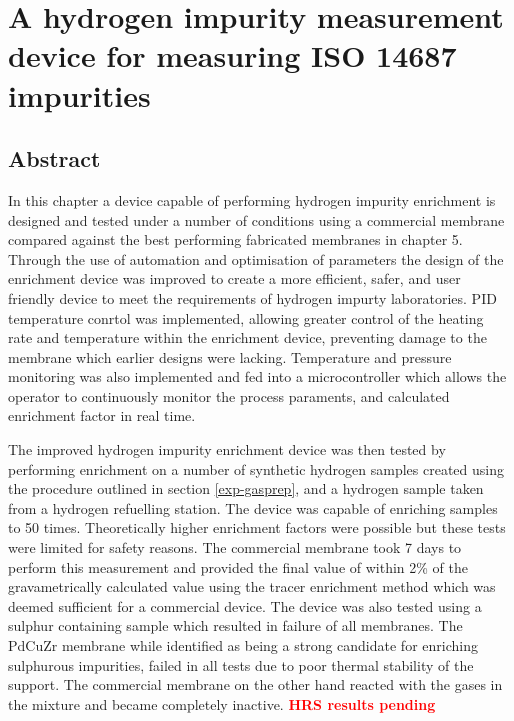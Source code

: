 \chapter{A hydrogen impurity measurement device for measuring ISO 14687 impurities}

\section*{Abstract}
In this chapter a device capable of performing hydrogen impurity enrichment is designed and tested under a number of conditions using a commercial membrane compared against the best performing fabricated membranes in chapter 5. 
Through the use of automation and optimisation of parameters the design of the enrichment device was improved to create a more efficient, safer, and user friendly device to meet the requirements of hydrogen impurty laboratories. PID temperature conrtol was implemented, allowing greater control of the heating rate and temperature within the enrichment device, preventing damage to the membrane which earlier designs were lacking. Temperature and pressure monitoring was also implemented and fed into a microcontroller which allows the operator to continuously monitor the process paraments, and calculated enrichment factor in real time. 

The improved hydrogen impurity enrichment device was then tested by performing enrichment on a number of synthetic hydrogen samples created using the procedure outlined in section \ref{exp-gasprep}, and a hydrogen sample taken from a hydrogen refuelling station. The device was capable of enriching samples to 50 times. Theoretically higher enrichment factors were possible but these tests were limited for safety reasons. The commercial membrane took 7 days to perform this measurement and provided the final value of within 2\% of the gravametrically calculated value using the tracer enrichment method which was deemed sufficient for a commercial device. The device was also tested using a sulphur containing sample which resulted in failure of all membranes. The PdCuZr membrane while identified as being a strong candidate for enriching sulphurous impurities, failed in all tests due to poor thermal stability of the support. The commercial membrane on the other hand reacted with the gases in the mixture and became completely inactive. \textcolor{red}{\textbf{HRS results pending}}


